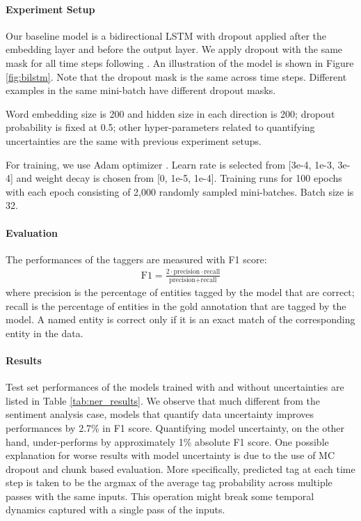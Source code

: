 \documentclass[letterpaper]{article} %
\begin{document}
\paragraph{Experiment Setup} Our baseline model is a bidirectional LSTM with dropout applied after the embedding layer and before the output layer. We apply dropout with the same mask for all time steps following \cite{gal2016theoretically}. An illustration of the model is shown in Figure \ref{fig:bilstm}. Note that the dropout mask is the same across time steps. Different examples in the same mini-batch have different dropout masks.

Word embedding size is 200 and hidden size in each direction is 200; dropout probability is fixed at 0.5; other hyper-parameters related to quantifying uncertainties are the same with previous experiment setups.

For training, we use Adam optimizer \cite{kingma2014adam}. Learn rate is selected from [3e-4, 1e-3, 3e-4] and weight decay is chosen from [0, 1e-5, 1e-4]. Training runs for 100 epochs with each epoch consisting of 2,000 randomly sampled mini-batches. Batch size is 32.

\paragraph{Evaluation}
The performances of the taggers are measured with F1 score:
\begin{align}
\text{F1}=\frac{2\cdot\text{precision}\cdot\text{recall}}{\text{precision}+\text{recall}}
\end{align}
where precision is the percentage of entities tagged by the model that are correct; recall is the percentage of entities in the gold annotation that are tagged by the model. A named entity is correct only if it is an exact match of the corresponding entity in the data.

\paragraph{Results}
Test set performances of the models trained with and without uncertainties are listed in Table \ref{tab:ner_results}. We observe that much different from the sentiment analysis case, models that quantify data uncertainty improves performances by 2.7\% in F1 score. Quantifying model uncertainty, on the other hand, under-performs by approximately 1\% absolute F1 score. One possible explanation for worse results with model uncertainty is due to the use of MC dropout and chunk based evaluation. More specifically, predicted tag at each time step is taken to be the argmax of the average tag probability across multiple passes with the same inputs. This operation might break some temporal dynamics captured with a single pass of the inputs.
\end{document}
